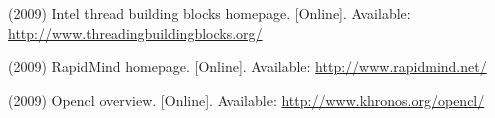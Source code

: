 \documentclass[10pt,conference,letterpaper]{IEEEtran}
\begin{document}
\begin{thebibliography}{1}
\BIBentryALTinterwordspacing
(2009) Intel thread building blocks homepage. [Online]. Available:
  \url{http://www.threadingbuildingblocks.org/}
\BIBentrySTDinterwordspacing

\BIBentryALTinterwordspacing
(2009) {R}apid{M}ind homepage. [Online]. Available:
  \url{http://www.rapidmind.net/}
\BIBentrySTDinterwordspacing

\BIBentryALTinterwordspacing
(2009) Opencl overview. [Online]. Available:
  \url{http://www.khronos.org/opencl/}
\BIBentrySTDinterwordspacing

\end{thebibliography}
\end{document}
